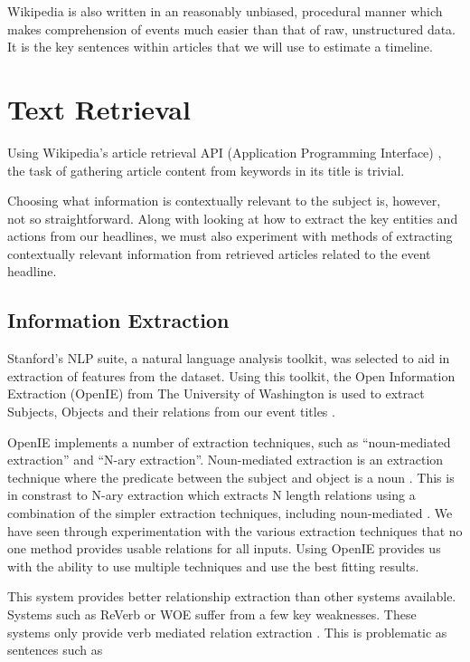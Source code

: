 \documentclass[bsc,frontabs,twoside,singlespacing,parskip,deptreport]{infthesis}     %
\begin{document}
Wikipedia is also written in an reasonably unbiased, procedural manner which makes comprehension of events much
easier than that of raw, unstructured data.
It is the key sentences within articles that we will use to estimate a timeline.

\section{Text Retrieval}
Using Wikipedia's article retrieval API (Application Programming Interface) \cite{wikipediaAPI}, the task of gathering article content
from keywords in its title is trivial.

Choosing what information is contextually relevant to the subject is, however, not so straightforward.
Along with looking at how to extract the key entities and actions from our 
headlines, we must also experiment with methods of extracting contextually relevant information from
retrieved articles related to the event headline.

\subsection{Information Extraction}
Stanford's NLP suite,
a natural language analysis toolkit,
was selected to aid in extraction of features from the dataset.
Using this toolkit, the Open Information Extraction (OpenIE) from
The University of Washington is used to extract Subjects, Objects
and their relations from our event titles \cite{schmitz2012open}.


OpenIE implements a number of extraction techniques, such as ``noun-mediated extraction'' and ``N-ary extraction''.
Noun-mediated extraction is an extraction technique where the predicate between the subject and object is a noun \cite{mirrezaei2015triplex}.
This is in constrast to N-ary extraction which extracts N length relations using a combination of the simpler extraction techniques, including noun-mediated \cite{akbik2012kraken}. 
We have seen through experimentation with the various extraction techniques that no one method provides
usable relations for all inputs. Using OpenIE provides us with the ability to use multiple techniques and
use the best fitting results.

This system provides better relationship extraction than other systems available. Systems such as
ReVerb\cite{fader2011identifying} or WOE\cite{wu2010open} suffer from a few key weaknesses. These systems only provide verb mediated relation extraction \cite{schmitz2012open}. This is problematic as sentences such as
\end{document}
